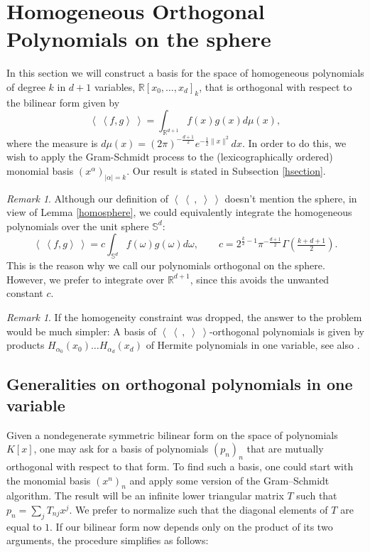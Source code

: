 \documentclass{amsart}
\newcommand{\bra}{\left<\!\!\!\:\left<}
\newcommand{\ket}{\right>\!\!\!\:\right>}
\newcommand{\R}{\mathbb{R}}
\renewcommand{\S}{\mathbb{S}}
\theoremstyle{plain}
\theoremstyle{definition}
\theoremstyle{remark}
\newtheorem{remark}[theorem]{Remark}
\begin{document}
\section{Homogeneous Orthogonal Polynomials on the sphere} \label{polynomialSection}
In this section we will construct a basis for the space of homogeneous polynomials of degree $k$ in $d+1$ variables, $\R[x_0,\ldots,x_d]_k$, that is orthogonal with respect to the bilinear form given by
\begin{equation*}
 \bra f,g\ket = \int_{\R^{d+1}}f(x)g(x) d\mu(x),
\end{equation*}
where the measure is $d\mu(x) = (2\pi)^{-\frac{d+1}{2}}e^{-\frac{1}{2}\|x\|^2}dx$. In order to do this, we wish to apply the Gram-Schmidt process to the (lexicographically ordered) monomial basis $(x^\alpha)_{|\alpha |=k}$. Our result is stated in Subsection \ref{hsection}. 
\begin{remark}
Although our definition of $\bra\ ,\;\ket$ doesn't mention the sphere, in view of Lemma \ref{homosphere}, we could equivalently integrate the homogeneous polynomials over the unit sphere $\S^d$:
$$
 \bra f,g\ket = c \int_{\S^{d}}f(\omega)g(\omega) d\omega, \qquad c = 2^{\frac{k}{2}-1}\pi^{-\frac{d+1}{2}}\Gamma\!\left(\tfrac{k+d+1}{2}\right).
$$ 
This is the reason why we call our polynomials orthogonal on the sphere. However, we prefer to integrate over $\R^{d+1}$, since this avoids the unwanted constant $c$.
\end{remark}
\begin{remark} \label{hermite}
 If the homogeneity constraint was dropped, the answer to the problem would be much simpler: A basis of $ \bra\ ,\;\ket$-orthogonal polynomials is given by products $H_{\alpha_0}\!(x_0)\ldots H_{\alpha_d}\!(x_d)$ of Hermite polynomials in one variable, see also \cite[Sect.~2.3.4]{Dunkl}.
\end{remark}



\subsection{Generalities on orthogonal polynomials in one variable}
Given a nondegenerate symmetric bilinear form on the space of polynomials $K[x]$, one may ask for a basis of polynomials $(p_n)_n$ that are mutually orthogonal with respect to that form. To find such a basis, one could start with the monomial basis $(x^n)_n$ and apply some version of the Gram--Schmidt algorithm. The result will be an infinite lower triangular matrix $T$ such that $p_n =\sum_j T_{nj} x^j$. We prefer to normalize such that the diagonal elements of $T$ are equal to $1$. If our bilinear form now depends only on the product of its two arguments, the procedure simplifies as follows:
\end{document}
